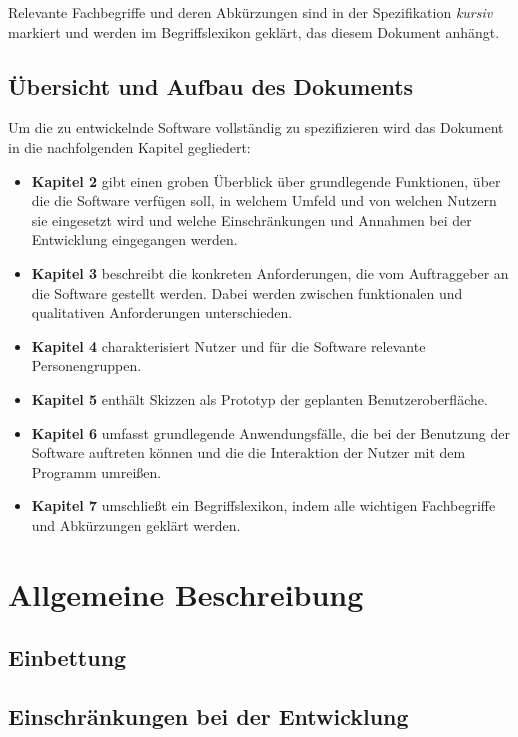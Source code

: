\documentclass[11pt]{article}
\begin{document}
Relevante Fachbegriffe und deren Abkürzungen sind in der Spezifikation \textit{kursiv} markiert und werden im Begriffslexikon geklärt, das diesem Dokument anhängt.

\subsection{Übersicht und Aufbau des Dokuments}

Um die zu entwickelnde Software vollständig zu spezifizieren wird das Dokument in die nachfolgenden Kapitel gegliedert:
\begin{itemize}
	\item[] \textbf{Kapitel 2} gibt einen groben Überblick über grundlegende Funktionen, über die die Software verfügen soll, in welchem Umfeld und von welchen Nutzern sie eingesetzt wird und welche Einschränkungen und Annahmen bei der Entwicklung eingegangen werden.
	\item[] \textbf{Kapitel 3} beschreibt die konkreten Anforderungen, die vom Auftraggeber an die Software gestellt werden. Dabei werden zwischen funktionalen und qualitativen Anforderungen unterschieden.
	\item[] \textbf{Kapitel 4} charakterisiert Nutzer und für die Software relevante Personengruppen.
	\item[] \textbf{Kapitel 5} enthält Skizzen als Prototyp der geplanten Benutzeroberfläche.
	\item[] \textbf{Kapitel 6} umfasst grundlegende Anwendungsfälle, die bei der Benutzung der Software auftreten können und die die Interaktion der Nutzer mit dem Programm umreißen.
	\item[] \textbf{Kapitel 7} umschließt ein Begriffslexikon, indem alle wichtigen Fachbegriffe und Abkürzungen geklärt werden.
\end{itemize}

\section{Allgemeine Beschreibung}

\subsection{Einbettung}

\subsection{Einschränkungen bei der Entwicklung}
\end{document}
